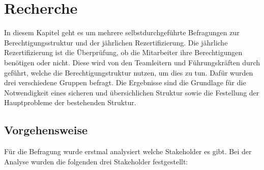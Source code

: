 \chapter{Recherche}
\label{ch:Recherche}
In diesem Kapitel geht es um mehrere selbstdurchgeführte Befragungen zur Berechtigungsstruktur und der jährlichen Rezertifizierung.
Die jährliche Rezertifizierung ist die Überprüfung, ob die Mitarbeiter ihre Berechtigungen benötigen oder nicht.
Diese wird von den Teamleitern und Führungskräften durch geführt, welche die Berechtigungstruktur nutzen, um dies zu tun.
Dafür wurden drei verschiedene Gruppen befragt.
Die Ergebnisse sind die Grundlage für die Notwendigkeit eines sicheren und übersichlichen Struktur sowie die Festellung der Hauptprobleme der bestehenden Struktur.

\section{Vorgehensweise}
\label{sec:Vorgehensweise}
Für die Befragung wurde erstmal analysiert welche Stakeholder es gibt.
Bei der Analyse wurden die folgenden drei Stakeholder festgestellt:

